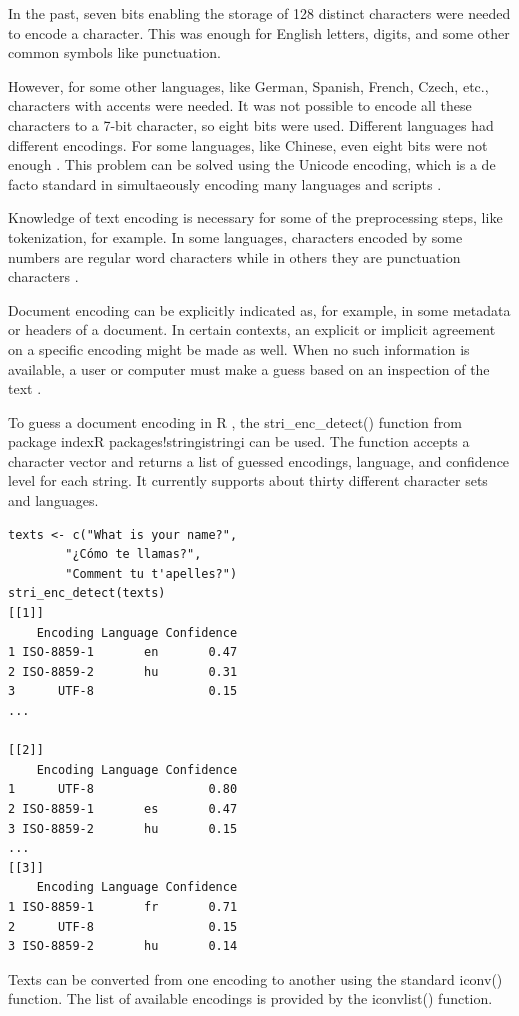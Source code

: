 \documentclass[11pt,openany,executivepaper]{book}
\begin{document}
In the past, seven bits enabling the storage of 128 distinct characters were needed to encode a character. This was enough for English letters, digits, and some other common symbols like punctuation.

However, for some other languages, like German, Spanish, French, Czech, etc., characters with accents were needed. It was not possible to encode all these characters to a 7-bit character, so eight bits were used. Different languages had different encodings. For some languages, like Chinese, even eight bits were not enough \cite{210}. This problem can be solved using the Unicode encoding, which is a de facto standard in simultaeously encoding many languages and scripts \cite{109}.

Knowledge of text encoding is necessary for some of the preprocessing steps, like tokenization, for example. In some languages, characters encoded by some numbers are regular word characters while in others they are punctuation characters \cite{210}.

Document encoding can be explicitly indicated as, for example, in some metadata or headers of a document. In certain contexts, an explicit or implicit agreement on a specific encoding might be made as well. When no such information is available, a user or computer must make a guess based on an inspection of the text \cite{149}.

To guess a document encoding in R , the stri\_enc\_detect() function from package indexR packages!stringistringi can be used. The function accepts a character vector and returns a list of guessed encodings, language, and confidence level for each string. It currently supports about thirty different character sets and languages.

\begin{verbatim}
texts <- c("What is your name?",
        "¿Cómo te llamas?",
        "Comment tu t'apelles?")
stri_enc_detect(texts)
[[1]]
    Encoding Language Confidence
1 ISO-8859-1       en       0.47
2 ISO-8859-2       hu       0.31
3      UTF-8                0.15
...

[[2]]
    Encoding Language Confidence
1      UTF-8                0.80
2 ISO-8859-1       es       0.47
3 ISO-8859-2       hu       0.15
...
[[3]]
    Encoding Language Confidence
1 ISO-8859-1       fr       0.71
2      UTF-8                0.15
3 ISO-8859-2       hu       0.14
\end{verbatim}

Texts can be converted from one encoding to another using the standard iconv() function. The list of available encodings is provided by the iconvlist() function.
\end{document}
